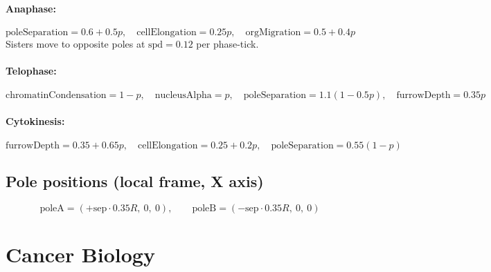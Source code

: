 \documentclass[11pt,a4paper]{article}
\newcommand{\eq}[1]{\begin{equation}#1\end{equation}}
\begin{document}
\paragraph{Anaphase:}
\eq{ \text{poleSeparation}=0.6+0.5 p,\quad \text{cellElongation}=0.25 p,\quad \text{orgMigration}=0.5+0.4 p }
Sisters move to opposite poles at $\text{spd}=0.12$ per phase-tick.

\paragraph{Telophase:}
\eq{ \text{chromatinCondensation}=1-p,\quad \text{nucleusAlpha}=p,\quad \text{poleSeparation}=1.1(1-0.5 p),\quad \text{furrowDepth}=0.35 p }

\paragraph{Cytokinesis:}
\eq{ \text{furrowDepth}=0.35+0.65 p,\quad \text{cellElongation}=0.25+0.2 p,\quad \text{poleSeparation}=0.55(1-p) }

\subsection{Pole positions (local frame, X axis)}
\eq{ \mathrm{poleA}=(+\mathrm{sep}\cdot 0.35 R,\ 0,\ 0),\qquad \mathrm{poleB}=(-\mathrm{sep}\cdot 0.35 R,\ 0,\ 0) }

\clearpage
\section{Cancer Biology}
\label{sec:cancer}
\end{document}
